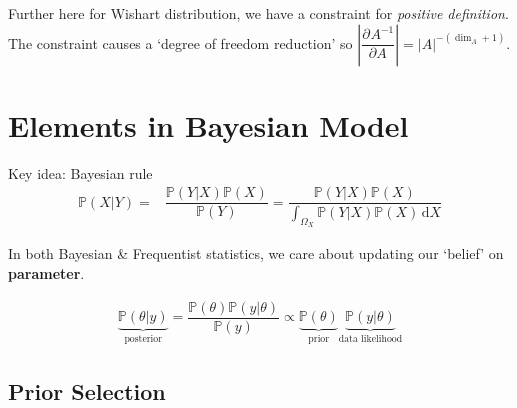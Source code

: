 \begin{itemize}[topsep=2pt,itemsep=0pt]
\begin{itemize}[topsep=2pt,itemsep=0pt]
{        Further here for Wishart distribution, we have a constraint for \textit{positive definition}. The constraint causes a `degree of freedom reduction' so $ \left|\dfrac{\partial^{}A^{-1}}{\partial A^{}}\right| = |A|^{-(\dim_A+1)} $.
        }
    \end{itemize}
        
    
\end{itemize}







    



\section{Elements in Bayesian Model}
Key idea: Bayesian rule
\begin{align}
    \mathbb{P}\left( X|Y \right)=&\dfrac{\mathbb{P}\left( Y|X \right) \mathbb{P}\left( X  \right) }{\mathbb{P}\left( Y \right) }=\dfrac{\mathbb{P}\left( Y|X  \right) \mathbb{P}\left( X  \right) }{\int _{\Omega_X} \mathbb{P}\left( Y|X  \right) \mathbb{P}\left( X  \right)  \,\mathrm{d}X} 
\end{align}

In both Bayesian \& Frequentist statistics, we care about updating our `belief' on \textbf{parameter}. 

\begin{align}
    \underbrace{\mathbb{P}\left( \theta |y  \right)}_{\text{posterior}} =\dfrac{\mathbb{P}\left( \theta  \right) \mathbb{P}\left( y|\theta  \right) }{\mathbb{P}\left( y  \right) }\propto \underbrace{\mathbb{P}\left( \theta  \right) }_{\text{prior}}\underbrace{\mathbb{P}\left( y|\theta  \right)  }_{\text{data likelihood}}
\end{align}


\subsection{Prior Selection}

